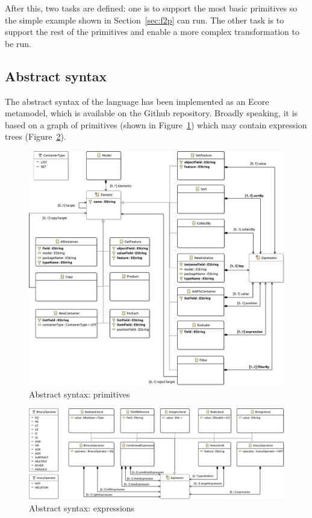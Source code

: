 \documentclass[a4paper]{scrartcl}
\begin{document}
After this, two tasks are defined: one is to support the most basic
primitives so the simple example shown in Section~\ref{sec:f2p} can
run. The other task is to support the rest of the primitives and
enable a more complex transformation to be run.

\subsection{Abstract syntax}
\label{sec:asyn}

The abstract syntax of the language has been implemented as an Ecore
metamodel, which is available on the Github repository. Broadly
speaking, it is based on a graph of primitives (shown in
Figure~\ref{fig:ast-primitives}) which may contain expression trees
(Figure~\ref{fig:ast-expressions}).

\begin{figure}
  \centering
  \includegraphics[width=\textwidth]{../dsl/eu.ttc.dataflow.model/model/primitives}
  \caption{Abstract syntax: primitives}
  \label{fig:ast-primitives}
\end{figure}

\begin{figure}
  \centering
  \includegraphics[width=\textwidth]{../dsl/eu.ttc.dataflow.model/model/expressions}  
  \caption{Abstract syntax: expressions}
  \label{fig:ast-expressions}
\end{figure}
\end{document}
